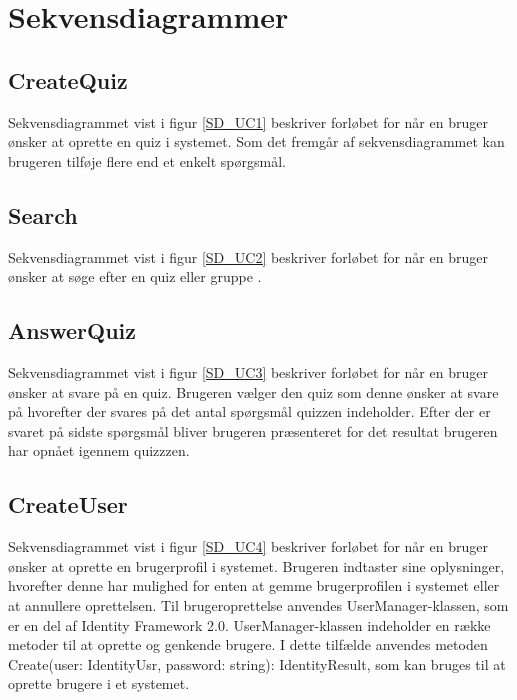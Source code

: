 \section{Sekvensdiagrammer}

\subsection*{CreateQuiz}
Sekvensdiagrammet vist i figur \ref{SD_UC1} beskriver forløbet for når en bruger ønsker at oprette en quiz i systemet. Som det fremgår af sekvensdiagrammet kan brugeren tilføje flere end et enkelt spørgsmål.


\subsection*{Search}
Sekvensdiagrammet vist i figur \ref{SD_UC2} beskriver forløbet for når en bruger ønsker at søge efter en quiz eller gruppe .


\subsection*{AnswerQuiz}
Sekvensdiagrammet vist i figur \ref{SD_UC3} beskriver forløbet for når en bruger ønsker at svare på en quiz. Brugeren vælger den quiz som denne ønsker at svare på hvorefter der svares på det antal spørgsmål quizzen indeholder. Efter der er svaret på sidste spørgsmål bliver brugeren præsenteret for det resultat brugeren har opnået igennem quizzzen.


\subsection*{CreateUser}
Sekvensdiagrammet vist i figur \ref{SD_UC4} beskriver forløbet for når en bruger ønsker at oprette en brugerprofil i systemet. Brugeren indtaster sine oplysninger, hvorefter denne har mulighed for enten at gemme brugerprofilen i systemet eller at annullere oprettelsen. Til brugeroprettelse anvendes UserManager-klassen, som er en del af Identity Framework 2.0. UserManager-klassen indeholder en række metoder til at oprette og genkende brugere. I dette tilfælde anvendes metoden Create(user: IdentityUsr, password: string): IdentityResult, som kan bruges til at oprette brugere i et systemet.

